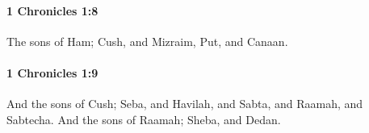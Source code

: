 		\paragraph{1 Chronicles 1:8} %
			\label{1CHRONICLES-1-8}

			The sons of Ham; Cush, and Mizraim, Put, and Canaan.


		\paragraph{1 Chronicles 1:9} %
			\label{1CHRONICLES-1-9}

			And the sons of Cush; Seba, and Havilah, and Sabta, and Raamah, and Sabtecha. And the sons of Raamah; Sheba, and Dedan.


